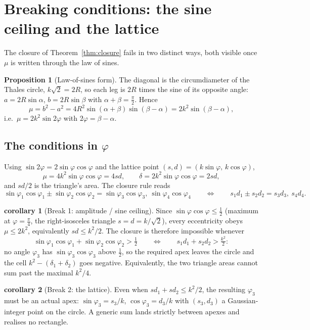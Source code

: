\documentclass[11pt]{article}
\theoremstyle{definition}
\newtheorem{proposition}{Proposition}
\newtheorem{corollary}{corollary}
\begin{document}
\section{Breaking conditions: the sine ceiling and the lattice}

The closure of Theorem~\ref{thm:closure} fails in two distinct ways, both visible
once $\mu$ is written through the law of sines.

\begin{proposition}[Law-of-sines form]\label{prop:lawsines}
The diagonal is the circumdiameter of the Thales circle, $k\sqrt2=2R$, so each leg
is $2R$ times the sine of its opposite angle: $a=2R\sin\alpha$, $b=2R\sin\beta$
with $\alpha+\beta=\tfrac{\pi}{2}$. Hence
\[
  \mu=b^{2}-a^{2}=4R^{2}\sin(\alpha+\beta)\sin(\beta-\alpha)=2k^{2}\sin(\beta-\alpha),
\]
i.e.\ $\mu=2k^{2}\sin2\varphi$ with $2\varphi=\beta-\alpha$.
\end{proposition}

\subsection*{The conditions in $\varphi$}

Using $\sin2\varphi=2\sin\varphi\cos\varphi$ and the lattice point
$(s,d)=(k\sin\varphi,\,k\cos\varphi)$,
\[
  \mu=4k^{2}\sin\varphi\cos\varphi=4sd,\qquad
  \delta=2k^{2}\sin\varphi\cos\varphi=2sd,
\]
and $sd/2$ is the triangle's area. The closure rule reads
\[
  \sin\varphi_1\cos\varphi_1\pm\sin\varphi_2\cos\varphi_2
   =\sin\varphi_3\cos\varphi_3,\ \sin\varphi_4\cos\varphi_4
  \qquad\Longleftrightarrow\qquad
  s_1d_1\pm s_2d_2=s_3d_3,\ s_4d_4 .
\]

\begin{corollary}[Break 1: amplitude / sine ceiling]\label{cor:break1}
Since $\sin\varphi\cos\varphi\le\tfrac12$ (maximum at $\varphi=\tfrac{\pi}{4}$,
the right-isosceles triangle $s=d=k/\sqrt2$), every eccentricity obeys
$\mu\le2k^{2}$, equivalently $sd\le k^{2}/2$. The closure is therefore impossible
whenever
\[
  \sin\varphi_1\cos\varphi_1+\sin\varphi_2\cos\varphi_2>\tfrac12
  \qquad\Longleftrightarrow\qquad
  s_1d_1+s_2d_2>\tfrac{k^{2}}{2}:
\]
no angle $\varphi_3$ has $\sin\varphi_3\cos\varphi_3$ above $\tfrac12$, so the
required apex leaves the circle and the cell $k^{2}-(\delta_1+\delta_2)$ goes
negative. Equivalently, the two triangle areas cannot sum past the maximal
$k^{2}/4$.
\end{corollary}

\begin{corollary}[Break 2: the lattice]\label{cor:break2}
Even when $sd_1+sd_2\le k^{2}/2$, the resulting $\varphi_3$ must be an actual
apex: $\sin\varphi_3=s_3/k$, $\cos\varphi_3=d_3/k$ with $(s_3,d_3)$ a
Gaussian-integer point on the circle. A generic sum lands strictly between
apexes and realises no rectangle.
\end{corollary}
\end{document}
